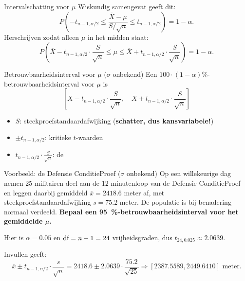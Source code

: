     \begin{frame}{Intervalschatting voor $\mu$}
        Wiskundig samengevat geeft dit:
        \[
            P\left(-t_{n-1,\alpha/2} \leq \frac{\overline{X} - \mu}{S / \sqrt{n}} \leq t_{n-1,\alpha/2}\right) = 1 - \alpha.
        \]
        \vfill\pause
        Herschrijven zodat alleen $\mu$ in het midden staat:
        \[
            P\left(\overline{X} - t_{n-1,\alpha/2}\cdot\frac{S}{\sqrt{n}} \leq \mu \leq \overline{X} + t_{n-1,\alpha/2}\cdot\frac{S}{\sqrt{n}}\right) = 1 - \alpha.
        \]
    \end{frame}

    \begin{frame}{Betrouwbaarheidsinterval voor $\mu$ ($\sigma$ onbekend)}
        Een $100 \cdot (1-\alpha) \%$-betrouwbaarheidsinterval voor $\mu$ is
        \[
            \left[\overline{X} - t_{n-1,\alpha/2} \cdot \frac{S}{\sqrt{n}}, \quad \overline{X} + t_{n-1,\alpha/2} \cdot \frac{S}{\sqrt{n}}\right]
        \]
        \vfill
        \begin{itemize}
            \item $S$: steekproefstandaardafwijking (\textbf{schatter, dus kansvariabele!})
            \item $\pm t_{n-1,\alpha/2}$: kritieke $t$-waarden
            \item $t_{n-1,\alpha/2} \cdot \frac{S}{\sqrt{n}}$: de 
        \end{itemize}
    \end{frame}

    \begin{frame}{Voorbeeld: de Defensie ConditieProef ($\sigma$ onbekend)}
        Op een willekeurige dag nemen $25$ militairen deel aan de 12-minutenloop van de Defensie ConditieProef
        en leggen daarbij gemiddeld $\overline{x}=2418.6$ meter af, met steekproefstandaardafwijking $s = 75.2$ meter.
        De populatie is bij benadering normaal verdeeld.
        \vfill
        \textbf{Bepaal een \SI{95}{\percent}-betrouwbaarheidsinterval voor het gemiddelde $\mu$.}
        \pause\vfill
        {\color{highlightcolor}
        Hier is $\alpha = 0.05$ en $\text{df}=n - 1 = 24$ vrijheidsgraden, dus $t_{24,0.025} \approx 2.0639$.

        Invullen geeft:
        \[
            \overline{x} \pm t_{n-1,\alpha/2} \cdot \frac{s}{\sqrt{n}} = 2418.6 \pm 2.0639 \cdot \frac{75.2}{\sqrt{25}} \Rightarrow [2387.5589, 2449.6410] \text{ meter.}
        \]}
    \end{frame}

